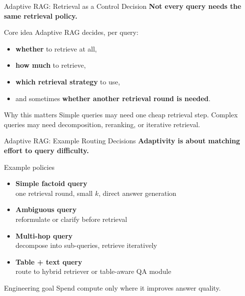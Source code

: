 \documentclass[aspectratio=169, xcolor=table]{beamer}
\newif\ifanimated
\newcommand{\cpause}{\ifanimated\pause\fi}
\begin{document}
\begin{frame}[shrink=10]{Adaptive RAG: Retrieval as a Control Decision}
\textbf{Not every query needs the same retrieval policy.}

\vspace{0.8em}
\begin{center}
\resizebox{0.8\textwidth}{!}{

}
\end{center}

\cpause
\begin{block}{Core idea}
Adaptive RAG decides, per query:
\begin{itemize}
  \item \textbf{whether} to retrieve at all,
  \item \textbf{how much} to retrieve,
  \item \textbf{which retrieval strategy} to use,
  \item and sometimes \textbf{whether another retrieval round is needed}.
\end{itemize}
\end{block}

\cpause
\begin{block}{Why this matters}
Simple queries may need one cheap retrieval step.
Complex queries may need decomposition, reranking, or iterative retrieval.
\end{block}
\end{frame}

\begin{frame}[shrink=10]{Adaptive RAG: Example Routing Decisions}
\textbf{Adaptivity is about matching effort to query difficulty.}

\vspace{0.7em}
\begin{block}{Example policies}
\begin{itemize}
  \item \textbf{Simple factoid query} \\
  one retrieval round, small $k$, direct answer generation
  \item \textbf{Ambiguous query} \\
  reformulate or clarify before retrieval
  \item \textbf{Multi-hop query} \\
  decompose into sub-queries, retrieve iteratively
  \item \textbf{Table + text query} \\
  route to hybrid retriever or table-aware QA module
\end{itemize}
\end{block}

\cpause
\begin{block}{Engineering goal}
Spend compute only where it improves answer quality.
\end{block}
\end{frame}
\end{document}
